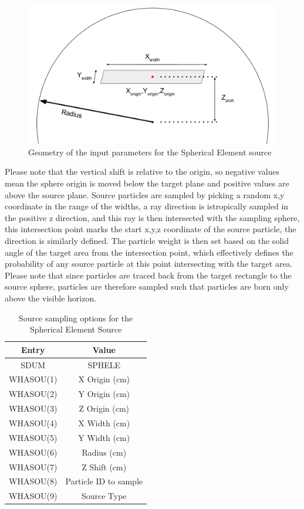 \begin{figure}[ht!]
 \begin{centering}
 \centering
 \includegraphics[width=0.6\paperwidth]{../figs/spherical_element_source.png}
 \caption{Geometry of the input parameters for the Spherical Element source}
 \label{fig:spherical_element}
 \end{centering}
\end{figure}
Please note that the vertical shift is relative to the origin, so negative values mean the sphere origin is moved below the target plane
and positive values are above the source plane. Source particles are sampled by picking a random x,y coordinate in the range of the 
widths, a ray direction is istropically sampled in the positive z direction, and this ray is then intersected with the sampling sphere, 
this intersection point marks the start x,y,z coordinate of the source particle, the direction is similarly defined. The particle weight
is then set based on the solid angle of the target area from the intersection point, which effectively defines the probability of 
any source particle at this point intersecting with the target area. Please note that since particles are traced back from the target 
rectangle to the source sphere, particles are therefore sampled such that particles are born only above the visible horizon.  

\begin{table}[ht!]
 \begin{tabular}{c|c}
 Entry & Value \\
 \hline
 SDUM & SPHELE \\
 WHASOU(1) & X Origin (cm) \\
 WHASOU(2) & Y Origin (cm) \\
 WHASOU(3) & Z Origin (cm) \\
 WHASOU(4) & X Width  (cm) \\
 WHASOU(5) & Y Width  (cm) \\
 WHASOU(6) & Radius   (cm) \\
 WHASOU(7) & Z Shift  (cm) \\
 WHASOU(8) & Particle ID to sample \\
 WHASOU(9) & Source Type 
 \end{tabular}
\label{tab:sphele_source}
\caption{Source sampling options for the Spherical Element Source}
\end{table}

